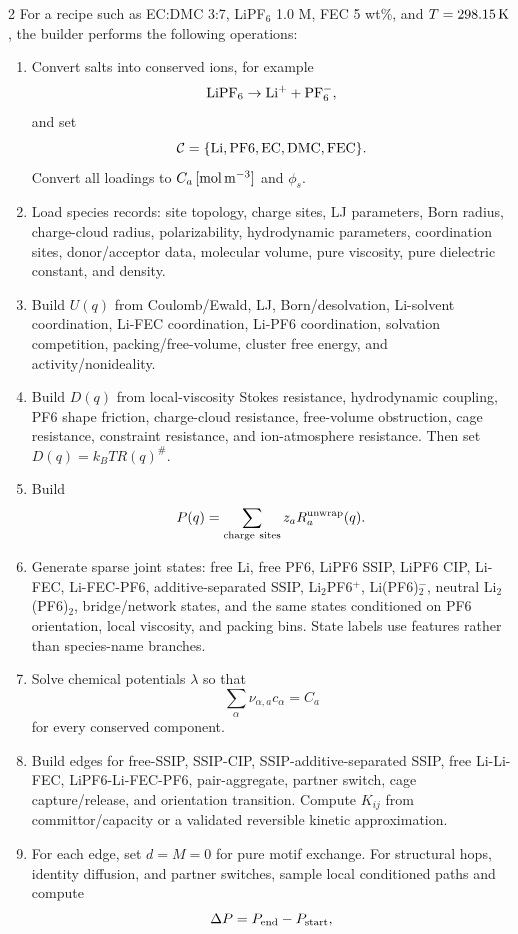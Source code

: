 \documentclass[10pt]{article}
\begin{document}
\begin{multicols}{2}
For a recipe such as EC:DMC 3:7, LiPF\(_6\) 1.0 M, FEC 5 wt\%, and
\(T=298.15\,{\rm K}\), the builder performs the following operations:
\begin{enumerate}[label={B\arabic*.},leftmargin=*]
\item Convert salts into conserved ions, for example
\[
{\rm LiPF_6}\rightarrow{\rm Li^+}+{\rm PF_6^-},
\]
and set
\[
\mathcal C=\{{\rm Li},{\rm PF6},{\rm EC},{\rm DMC},{\rm FEC}\}.
\]
Convert all loadings to \(C_a\,[{\rm mol\,m^{-3}}]\) and \(\phi_s\).
\item Load species records: site topology, charge sites, LJ parameters, Born
radius, charge-cloud radius, polarizability, hydrodynamic parameters,
coordination sites, donor/acceptor data, molecular volume, pure viscosity,
pure dielectric constant, and density.
\item Build \(U(q)\) from Coulomb/Ewald, LJ, Born/desolvation, Li-solvent
coordination, Li-FEC coordination, Li-PF6 coordination, solvation competition,
packing/free-volume, cluster free energy, and activity/nonideality.
\item Build \(D(q)\) from local-viscosity Stokes resistance, hydrodynamic
coupling, PF6 shape friction, charge-cloud resistance, free-volume
obstruction, cage resistance, constraint resistance, and ion-atmosphere
resistance. Then set \(D(q)=k_BT R(q)^\#\).
\item Build
\[
P(q)=\sum_{\rm charge\ sites}z_aR_a^{\rm unwrap}(q).
\]
\item Generate sparse joint states: free Li, free PF6, LiPF6 SSIP, LiPF6 CIP,
Li-FEC, Li-FEC-PF6, additive-separated SSIP, Li\(_2\)PF6\(^+\),
Li(PF6)\(_2^-\), neutral Li\(_2\)(PF6)\(_2\), bridge/network states, and the
same states conditioned on PF6 orientation, local viscosity, and packing bins.
State labels use features rather than species-name branches.
\item Solve chemical potentials \(\lambda\) so that
\[
\sum_\alpha\nu_{\alpha,a}c_\alpha=C_a
\]
for every conserved component.
\item Build edges for free-SSIP, SSIP-CIP, SSIP-additive-separated SSIP,
free Li-Li-FEC, LiPF6-Li-FEC-PF6, pair-aggregate, partner switch, cage
capture/release, and orientation transition. Compute \(K_{ij}\) from
committor/capacity or a validated reversible kinetic approximation.
\item For each edge, set \(d=M=0\) for pure motif exchange. For structural
hops, identity diffusion, and partner switches, sample local conditioned paths
and compute
\[
\Delta P=P_{\rm end}-P_{\rm start},
\]
\end{enumerate}
\end{multicols}
\end{document}
